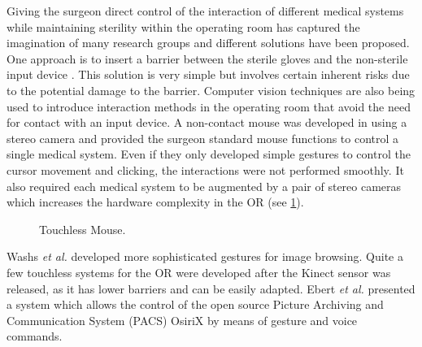 Giving the surgeon direct control of the interaction of different medical systems while maintaining sterility within the operating room has captured the imagination of many research groups and different solutions have been proposed. 
One approach is to insert a barrier between the sterile gloves and the non-sterile input device \cite{Ionescu2006}. This solution is very simple but involves certain inherent risks due to the potential damage to the barrier. Computer vision techniques are also being used to introduce interaction methods in the operating room that avoid the need for contact with an input device.
A non-contact mouse was developed in \cite{Gratzel2004a} using a stereo camera and provided the surgeon standard mouse functions to control a single medical system. Even if they only developed simple gestures to control the cursor movement and clicking, the interactions were not performed smoothly. It also required each medical system to be augmented by a pair of stereo cameras which increases the hardware complexity in the OR (see \figurename{\ref{fig:2-bg:touchlessMouse}}). 
\begin{figure}
	\centering
	\qquad
	\caption{Touchless Mouse.}
	\label{fig:2-bg:touchlessMouse}
\end{figure}
Washs \textit{et al.} \cite{Wachs2008} developed more sophisticated gestures for image browsing.
Quite a few touchless systems \cite{Strickland2013,Ebert2013,Tan2013} for the OR were developed after the Kinect sensor was released, as it has lower barriers and can be easily adapted.
Ebert \textit{et al.} \cite{Ebert2013} presented a system which allows the control of the open source Picture Archiving and Communication System (PACS) OsiriX by means of gesture and voice commands.   
